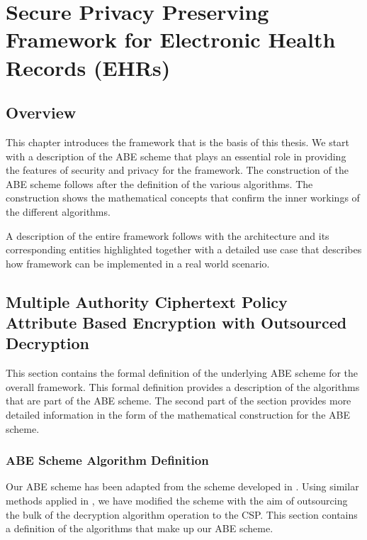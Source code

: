 \chapter{Secure Privacy Preserving Framework for Electronic Health Records (EHRs)}
\label{chap:framework_and_system_description}

\renewcommand{\theenumi}{\Alph{enumi}}
\renewcommand{\theenumii}{\roman{enumii}}


\section{Overview}

This chapter introduces the framework that is the basis of this thesis. We start with a description of the ABE scheme that plays an essential role in providing the features of security and privacy for the framework. The construction of the ABE scheme follows after the definition of the various algorithms. The construction shows the mathematical concepts that confirm the inner workings of the different algorithms.

A description of the entire framework follows with the architecture and its corresponding entities highlighted together with a detailed use case that describes how framework can be implemented in a real world scenario.


\section{Multiple Authority Ciphertext Policy Attribute Based Encryption with Outsourced Decryption}

This section contains the formal definition of the underlying ABE scheme for the overall framework. This formal definition provides a description of the algorithms that are part of the ABE scheme. The second part of the section provides more detailed information in the form of the mathematical construction for the ABE scheme.

\subsection{ABE Scheme Algorithm Definition}

Our ABE scheme has been adapted from the scheme developed in \cite{Yang2014}. Using similar methods applied in \cite{Green2011outsource}, we have modified the scheme with the aim of outsourcing the bulk of the decryption algorithm operation to the CSP. This section contains a definition of the algorithms that make up our ABE scheme.

